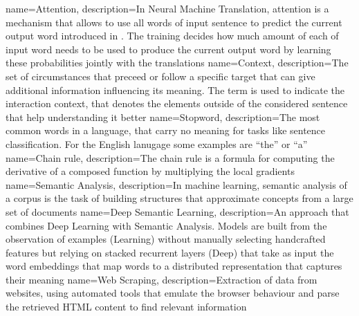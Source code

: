 
{
  name={Attention},
  description={In Neural Machine Translation, attention is a mechanism that allows to use all words of input sentence to predict the current output word introduced in \cite{bahdanau2014neural}. The training decides how much amount of each of input word needs to be used to produce the current output word by learning these probabilities jointly with the translations}
}
{
  name={Context},
  description={The set of circumstances that preceed or follow a specific target that can give additional information influencing its meaning. The term is used to indicate the interaction context, that denotes the elements outside of the considered sentence that help understanding it better}
}
{
  name={Stopword},
  description={The most common words in a language, that carry no meaning for tasks like sentence classification. For the English lanugage some examples are ``the'' or ``a''}
}
{
  name={Chain rule},
  description={The chain rule is a formula for computing the derivative of a composed function by multiplying the local gradients}
}
{
  name={Semantic Analysis},
  description={In machine learning, semantic analysis of a corpus is the task of building structures that approximate concepts from a large set of documents}
}
{
  name={Deep Semantic Learning},
  description={An approach that combines Deep Learning with Semantic Analysis. Models are built from the observation of examples (Learning) without manually selecting handcrafted features but relying on stacked recurrent layers (Deep) that take as input the word embeddings that map words to a distributed representation that captures their meaning}
}
{
  name={Web Scraping},
  description={Extraction of data from websites, using automated tools that emulate the browser behaviour and parse the retrieved HTML content to find relevant information}
}
